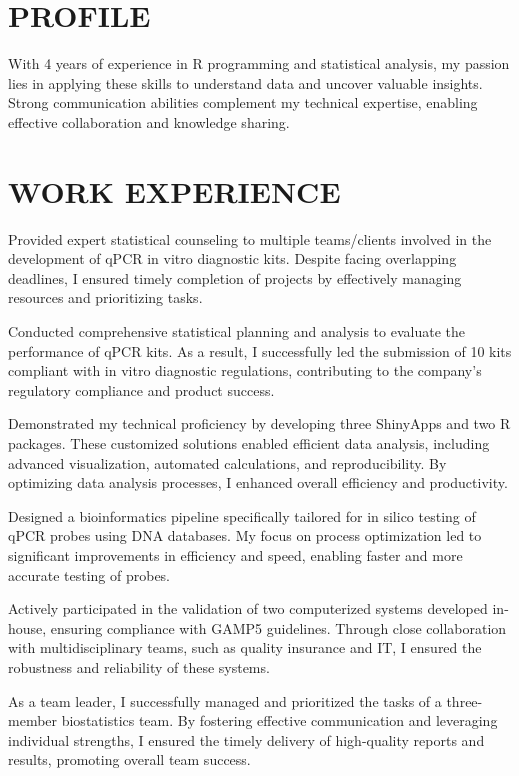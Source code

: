\documentclass[]{plushcv}
\begin{document}
\begin{minipage}[t]{0.70\textwidth} 
\sectionsep
\section{PROFILE}
With 4 years of experience in R programming and statistical analysis, my passion lies in applying these skills to understand data and uncover valuable insights. Strong communication abilities complement my technical expertise, enabling effective collaboration and knowledge sharing.

\sectionsep
\sectionsep

\sectionsep

\section{WORK EXPERIENCE}

\begin{tightemize}
\sectionsep
\sectionsep
\item Provided expert statistical counseling to multiple teams/clients involved in the development of qPCR in vitro diagnostic kits. Despite facing overlapping deadlines, I ensured timely completion of projects by effectively managing resources and prioritizing tasks.
\item Conducted comprehensive statistical planning and analysis to evaluate the performance of qPCR kits. As a result, I successfully led the submission of 10 kits compliant with in vitro diagnostic regulations, contributing to the company's regulatory compliance and product success.
\item Demonstrated my technical proficiency by developing three ShinyApps and two R packages. These customized solutions enabled efficient data analysis, including advanced visualization, automated calculations, and reproducibility. By optimizing data analysis processes, I enhanced overall efficiency and productivity.
\item Designed a bioinformatics pipeline specifically tailored for in silico testing of qPCR probes using DNA databases. My focus on process optimization led to significant improvements in efficiency and speed, enabling faster and more accurate testing of probes.
\item Actively participated in the validation of two computerized systems developed in-house, ensuring compliance with GAMP5 guidelines. Through close collaboration with multidisciplinary teams, such as quality insurance and IT, I ensured the robustness and reliability of these systems.
\item As a team leader, I successfully managed and prioritized the tasks of a three-member biostatistics team. By fostering effective communication and leveraging individual strengths, I ensured the timely delivery of high-quality reports and results, promoting overall team success.


\end{tightemize}
\end{minipage}
\end{document}
